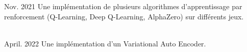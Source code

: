 \documentclass[10pt,a4paper,ragged2e,withhyper]{altacv}
\begin{document}
\begin{paracol}{2}
            {Nov. 2021}{}
            Une implémentation de plusieurs algorithmes d'apprentissage par renforcement
            (Q-Learning, Deep Q-Learning, AlphaZero)
            sur différents jeux.\\
            \vspace{4pt}
            \\
            \vspace{4pt}
            \divider

            {April. 2022}{}
            Une implémentation d'un Variational Auto Encoder.\\
            \vspace{4pt}
            \\
            \vspace{4pt}

    \end{paracol}
\end{document}
